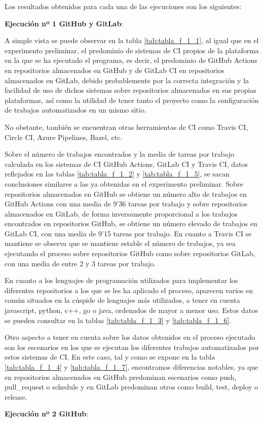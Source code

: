 Los resultados obtenidos para cada una de las ejecuciones son los siguientes:
\begin{compactitem}
    \item \textbf{Ejecución nº 1 GitHub y GitLab}: 
    
    A simple vista se puede observar en la tabla \ref{tab:tabla_f_1_1}, al igual que en el experimento preliminar, el predominio de sistemas de CI propios de la plataforma en la que se ha ejecutado el programa, es decir, el predominio de GitHub Actions en repositorios almacenados en GitHub y de GitLab CI en repositorios almacenados en GitLab, debido probablemente por la correcta integración y la facilidad de uso de dichos sistemas sobre repositorios almacenados en sus propias plataformas, así como la utilidad de tener tanto el proyecto como la configuración de trabajos automatizados en un mismo sitio.

    No obstante, también se encuentran otras herramientas de CI como Travis CI, Circle CI, Azure Pipelines, Bazel, etc.

    Sobre el número de trabajos encontrados y la media de tareas por trabajo calculada en los sistemas de CI GitHub Actions, GitLab CI y Travis CI, datos reflejados en las tablas \ref{tab:tabla_f_1_2} y \ref{tab:tabla_f_1_5}, se sacan conclusiones similares a las ya obtenidas en el experimento preliminar. Sobre repositorios almacenados en GitHub se obtiene un número alto de trabajos en GitHub Actions con una media de 9'36 tareas por trabajo y sobre repositorios almacenados en GitLab, de forma inversamente proporcional a los trabajos encontrados en repositorios GitHub, se obtiene un número elevado de trabajos en GitLab CI, con una media de 9'15 tareas por trabajo. En cuanto a Travis CI se mantiene se observa que se mantiene estable el número de trabajos, ya sea ejecutando el proceso sobre repositorios GitHub como sobre repositorios GitLab, con una media de entre 2 y 3 tareas por trabajo.

    En cuanto a los lenguajes de programación utilizados para implementar los diferentes repositorios a los que se les ha aplicado el proceso, aparecen varios en común situados en la cúspide de lenguajes más utilizados, a tener en cuenta javascript, python, c++, go o java, ordenados de mayor a menor uso. Estos datos se pueden consultar en la tablas \ref{tab:tabla_f_1_3} y \ref{tab:tabla_f_1_6}.

    Otro aspecto a tener en cuenta sobre los datos obtenidos en el proceso ejecutado son los escenarios en los que se ejecutan los diferentes trabajos automatizados por estos sistemas de CI. En este caso, tal y como se expone en la tabla \ref{tab:tabla_f_1_4} y \ref{tab:tabla_f_1_7}, encontramos diferencias notables, ya que en repositorios almacenados en GitHub predominan escenarios como push, pull\_request o schedule y en GitLab predominan otros como build, test, deploy o release.
    \item \textbf{Ejecución nº 2 GitHub}:
    

\end{compactitem}
